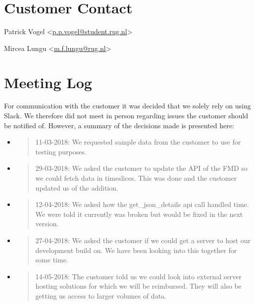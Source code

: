 \hypertarget{customer-contact}{%
\section{Customer Contact}\label{customer-contact}}

Patrick Vogel
\textless{}\href{mailto:p.p.vogel@student.rug.nl}{{p.p.vogel@student.rug.nl}}\textgreater{}

Mircea Lungu
\textless{}\href{mailto:m.f.lungu@rug.nl}{{m.f.lungu@rug.nl}}\textgreater{}

\hypertarget{meeting-log}{%
\section{Meeting Log}\label{meeting-log}}

For communication with the customer it was decided that we solely rely
on using Slack. We therefore did not meet in person regarding issues the
customer should be notified of. However, a summary of the decisions made
is presented here:

\begin{itemize}
\item
  \begin{quote}
  11-03-2018: We requested sample data from the customer to use for
  testing purposes.
  \end{quote}
\item
  \begin{quote}
  29-03-2018: We asked the customer to update the API of the FMD so we
  could fetch data in timeslices. This was done and the customer updated
  us of the addition.
  \end{quote}
\item
  \begin{quote}
  12-04-2018: We asked how the get\_json\_details api call handled time.
  We were told it currently was broken but would be fixed in the next
  version.
  \end{quote}
\item
  \begin{quote}
  27-04-2018: We asked the customer if we could get a server to host our
  development build on. We have been looking into this together for some
  time.
  \end{quote}
\item
  \begin{quote}
  14-05-2018: The customer told us we could look into external server
  hosting solutions for which we will be reimbursed. They will also be
  getting us access to larger volumes of data.
  \end{quote}
\end{itemize}


